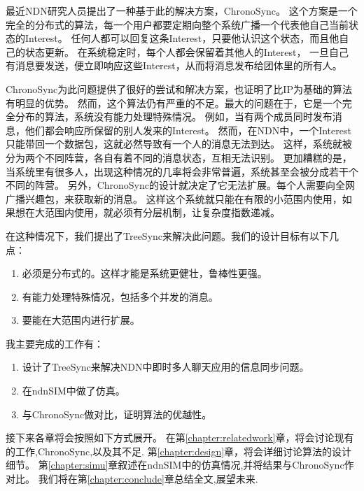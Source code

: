 最近NDN研究人员提出了一种基于此的解决方案，ChronoSync\cite{zhu2013let}。
这个方案是一个完全的分布式的算法，每一个用户都要定期向整个系统广播一个代表他自己当前状态的Interest。
任何人都可以回复这条Interest，只要他认识这个状态，而且他自己的状态更新。
在系统稳定时，每个人都会保留着其他人的Interest，
一旦自己有消息要发送，便立即响应这些Interest，从而将消息发布给团体里的所有人。

ChronoSync为此问题提供了很好的尝试和解决方案，也证明了比IP为基础的算法有明显的优势。
然而，这个算法仍有严重的不足。最大的问题在于，它是一个完全分布的算法，系统没有能力处理特殊情况。
例如，当有两个成员同时发布消息，他们都会响应所保留的别人发来的Interest。
然而，在NDN中，一个Interest只能带回一个数据包，这就必然导致有一个人的消息无法到达。
这样，系统就被分为两个不同阵营，各自有着不同的消息状态，互相无法识别。
更加糟糕的是，当系统里有很多人，出现这种情况的几率将会非常普遍，系统甚至会被分成若干个不同的阵营。
另外，ChronoSync的设计就决定了它无法扩展。每个人需要向全网广播兴趣包，来获取新的消息。
这样这个系统就只能在有限的小范围内使用，如果想在大范围内使用，就必须有分层机制，让复杂度指数递减。

在这种情况下，我们提出了TreeSync来解决此问题。我们的设计目标有以下几点：

\begin{enumerate}
  \item 必须是分布式的。这样才能是系统更健壮，鲁棒性更强。
  \item 有能力处理特殊情况，包括多个并发的消息。
  \item 要能在大范围内进行扩展。
\end{enumerate}

我主要完成的工作有：

\begin{enumerate}
  \item 设计了TreeSync来解决NDN中即时多人聊天应用的信息同步问题。
  \item 在ndnSIM\cite{afanasyev2012ndnsim}中做了仿真。
  \item 与ChronoSync做对比，证明算法的优越性。
\end{enumerate}

接下来各章将会按照如下方式展开。
在第\ref{chapter:relatedwork}章，将会讨论现有的工作,ChronoSync,以及其不足.
第\ref{chapter:design}章，将会详细讨论算法的设计细节。
第\ref{chapter:simu}章叙述在ndnSIM中的仿真情况,并将结果与ChronoSync作对比。
我们将在第\ref{chapter:conclude}章总结全文,展望未来.
